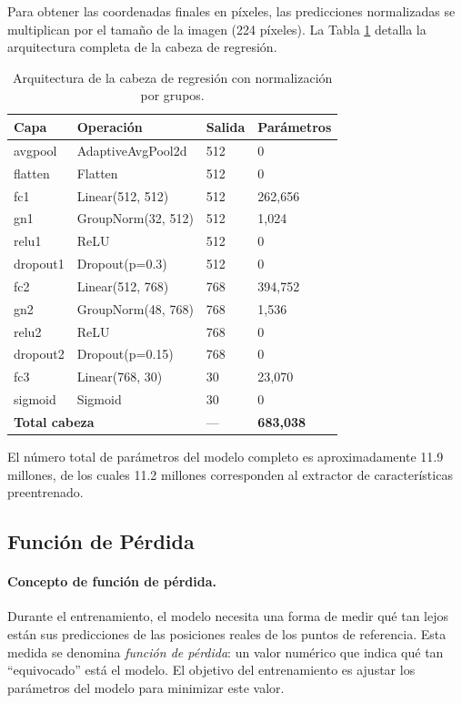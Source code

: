 Para obtener las coordenadas finales en píxeles, las predicciones normalizadas se multiplican por el tamaño de la imagen (224 píxeles). La Tabla \ref{tab:head_arquitectura} detalla la arquitectura completa de la cabeza de regresión.

\begin{table}[htbp]
    \centering
    \caption{Arquitectura de la cabeza de regresión con normalización por grupos.}
    \label{tab:head_arquitectura}
    \small
    \setlength{\tabcolsep}{3pt}
    \begin{tabular}{@{}p{2.0cm}p{3.2cm}p{2.5cm}p{2.5cm}@{}}
        \toprule
        \textbf{Capa} & \textbf{Operación} & \textbf{Salida} & \textbf{Parámetros} \\
        \midrule
        avgpool & AdaptiveAvgPool2d & 512 & 0 \\
        flatten & Flatten & 512 & 0 \\
        fc1 & Linear(512, 512) & 512 & 262,656 \\
        gn1 & GroupNorm(32, 512) & 512 & 1,024 \\
        relu1 & ReLU & 512 & 0 \\
        dropout1 & Dropout(p=0.3) & 512 & 0 \\
        fc2 & Linear(512, 768) & 768 & 394,752 \\
        gn2 & GroupNorm(48, 768) & 768 & 1,536 \\
        relu2 & ReLU & 768 & 0 \\
        dropout2 & Dropout(p=0.15) & 768 & 0 \\
        fc3 & Linear(768, 30) & 30 & 23,070 \\
        sigmoid & Sigmoid & 30 & 0 \\
        \midrule
        \multicolumn{2}{l}{\textbf{Total cabeza}} & --- & \textbf{683,038} \\
        \bottomrule
    \end{tabular}
\end{table}

El número total de parámetros del modelo completo es aproximadamente 11.9 millones, de los cuales 11.2 millones corresponden al extractor de características preentrenado.

\subsection{Función de Pérdida}
\label{subsec:funcion_perdida}

\paragraph{Concepto de función de pérdida.}
Durante el entrenamiento, el modelo necesita una forma de medir qué tan lejos están sus predicciones de las posiciones reales de los puntos de referencia. Esta medida se denomina \textit{función de pérdida}: un valor numérico que indica qué tan ``equivocado'' está el modelo. El objetivo del entrenamiento es ajustar los parámetros del modelo para minimizar este valor.

